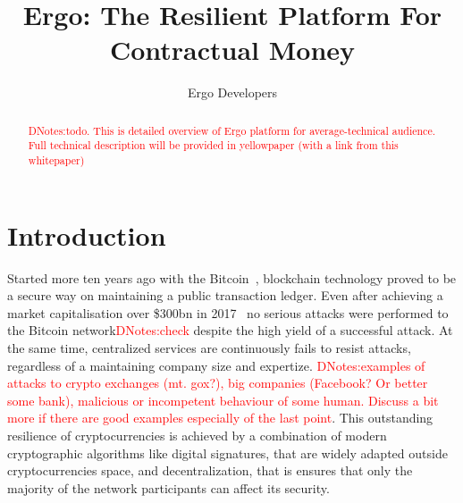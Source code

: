 \documentclass[]{article}
\newcommand{\dnote}[1]{{\textcolor{red}{DNotes:{#1}}}}
\begin{document}
    \title{Ergo: The Resilient Platform For Contractual Money}
    \author{Ergo Developers}


    \maketitle

    \begin{abstract}
        \dnote{todo. This is detailed overview of Ergo platform for average-technical audience. Full technical description will be provided in yellowpaper (with a link from this whitepaper)}
    \end{abstract}



    \section{Introduction}


    Started more ten years ago with the Bitcoin~\cite{nakamoto2008bitcoin}, blockchain technology proved to be a secure way on maintaining
    a public transaction ledger.
    Even after achieving a market capitalisation over \$300bn in 2017~\cite{btcPrice}
    no serious attacks were performed to the Bitcoin network\dnote{check} despite the high yield of a successful attack.
    At the same time, centralized services are continuously fails to resist attacks, regardless of a maintaining company size and expertize.
    \dnote{examples of attacks to crypto exchanges (mt. gox?), big companies (Facebook? Or better some bank), malicious or incompetent behaviour of some human.
    Discuss a bit more if there are good examples especially of the last point}.
    This outstanding resilience of cryptocurrencies is achieved by a combination of modern cryptographic algorithms like digital
    signatures, that are widely adapted outside cryptocurrencies space, and decentralization, that is ensures that only
    the majority of the network participants can affect its security.
\end{document}
